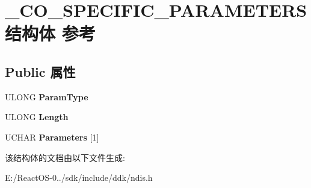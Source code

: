 \hypertarget{struct___c_o___s_p_e_c_i_f_i_c___p_a_r_a_m_e_t_e_r_s}{}\section{\+\_\+\+C\+O\+\_\+\+S\+P\+E\+C\+I\+F\+I\+C\+\_\+\+P\+A\+R\+A\+M\+E\+T\+E\+R\+S结构体 参考}
\label{struct___c_o___s_p_e_c_i_f_i_c___p_a_r_a_m_e_t_e_r_s}
\subsection*{Public 属性}
\begin{DoxyCompactItemize}
\item 
\mbox{\label{struct___c_o___s_p_e_c_i_f_i_c___p_a_r_a_m_e_t_e_r_s_a2e4edd87a60f46c6ea9da56ff1f46d19}} 
U\+L\+O\+NG {\bfseries Param\+Type}
\item 
\mbox{\label{struct___c_o___s_p_e_c_i_f_i_c___p_a_r_a_m_e_t_e_r_s_ab20a2bdd683c7c122d4341725a5f578d}} 
U\+L\+O\+NG {\bfseries Length}
\item 
\mbox{\label{struct___c_o___s_p_e_c_i_f_i_c___p_a_r_a_m_e_t_e_r_s_af36ec07c2b2cd511704893bafb5362fe}} 
U\+C\+H\+AR {\bfseries Parameters} \mbox{[}1\mbox{]}
\end{DoxyCompactItemize}


该结构体的文档由以下文件生成\+:\begin{DoxyCompactItemize}
\item 
E\+:/\+React\+O\+S-\/0../sdk/include/ddk/ndis.\+h\end{DoxyCompactItemize}
